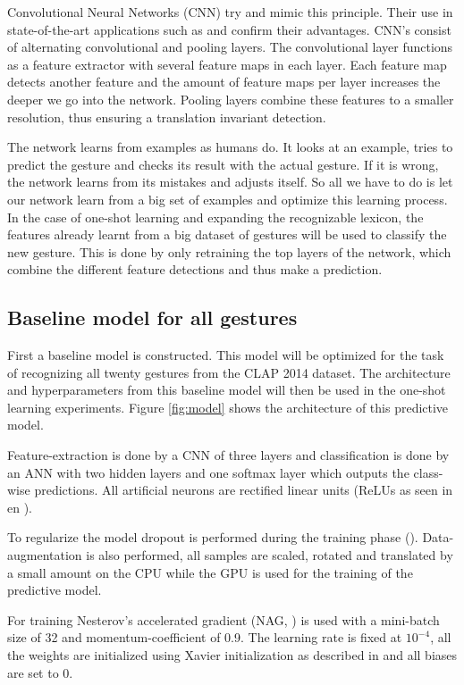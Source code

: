 \documentclass[twocolumn]{phdsymp} %
\begin{document}
Convolutional Neural Networks (CNN) try and mimic this principle. Their use in state-of-the-art applications such as \cite{karpathy_large-scale_2014} and \cite{krizhevsky2012imagenet} confirm their advantages. CNN's consist of alternating convolutional and pooling layers. The convolutional layer functions as a feature extractor with several feature maps in each layer. Each feature map detects another feature and the amount of feature maps per layer increases the deeper we go into the network. Pooling layers combine these features to a smaller resolution, thus ensuring a translation invariant detection.

The network learns from examples as humans do. It looks at an example, tries to predict the gesture and checks its result with the actual gesture. If it is wrong, the network learns from its mistakes and adjusts itself. So all we have to do is let our network learn from a big set of examples and optimize this learning process.
In the case of one-shot learning and expanding the recognizable lexicon, the features already learnt from a big dataset of gestures will be used to classify the new gesture. This is done by only retraining the top layers of the network, which combine the different feature detections and thus make a prediction.
\subsection{Baseline model for all gestures}
First a baseline model is constructed. This model will be optimized for the task of recognizing all twenty gestures from the CLAP 2014 dataset. The architecture and hyperparameters from this baseline model will then be used in the one-shot learning experiments. Figure \ref{fig:model} shows the architecture of this predictive model. 

Feature-extraction is done by a CNN of three layers and classification is done by an ANN with two hidden layers and one softmax layer which outputs the class-wise predictions. All artificial neurons are rectified linear units (ReLUs as seen in \cite{ReLU} en \cite{wu_deep_2016}).

To regularize the model dropout is performed during the training phase (\cite{dropout}). Data-augmentation is also performed, all samples are scaled, rotated and translated by a small amount on the CPU while the GPU is used for the training of the predictive model.

For training Nesterov's accelerated gradient (NAG, \cite{sutskever2013importance}) is used with a mini-batch size of 32 and momentum-coefficient of 0.9. The learning rate is fixed at $10^{-4}$, all the weights are initialized using Xavier initialization as described in \cite{glorot-1} and all biases are set to 0.
\end{document}
